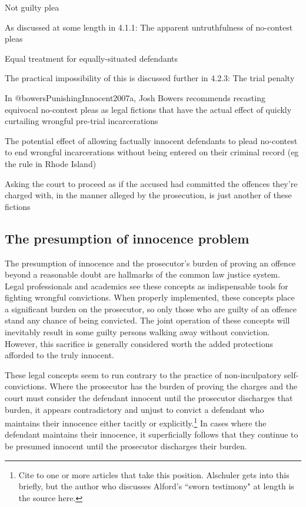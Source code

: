 Not guilty plea

As discussed at some length in 4.1.1: The apparent untruthfulness of no-contest pleas

Equal treatment for equally-situated defendants

The practical impossibility of this is discussed further in 4.2.3: The trial penalty

In @bowersPunishingInnocent2007a, Josh Bowers recommends recasting equivocal no-contest pleas as legal fictions that have the actual effect of quickly curtailing wrongful pre-trial incarcerations

The potential effect of allowing factually innocent defendants to plead no-contest to end wrongful incarcerations without being entered on their criminal record (eg the rule in Rhode Island)

Asking the court to proceed as if the accused had committed the offences they're charged with, in the manner alleged by the prosecution, is just another of these fictions

\subsection{The presumption of innocence problem}

The presumption of innocence and the prosecutor's burden of proving an offence beyond a reasonable doubt are hallmarks of the common law justice system. Legal professionals and academics see these concepts as indispensable tools for fighting wrongful convictions. When properly implemented, these concepts place a significant burden on the prosecutor, so only those who are guilty of an offence stand any chance of being convicted. The joint operation of these concepts will inevitably result in some guilty persons walking away without conviction. However, this sacrifice is generally considered worth the added protections afforded to the truly innocent. 

These legal concepts seem to run contrary to the practice of non-inculpatory self-convictions. Where the prosecutor has the burden of proving the charges and the court must consider the defendant innocent until the prosecutor discharges that burden, it appears contradictory and unjust to convict a defendant who maintains their innocence either tacitly or explicitly.\footnote{Cite to one or more articles that take this position. Alschuler gets into this briefly, but the author who discusses Alford's ``sworn testimony" at length is the source here.} In cases where the defendant maintains their innocence, it superficially follows that they continue to be presumed innocent until the prosecutor discharges their burden. 

